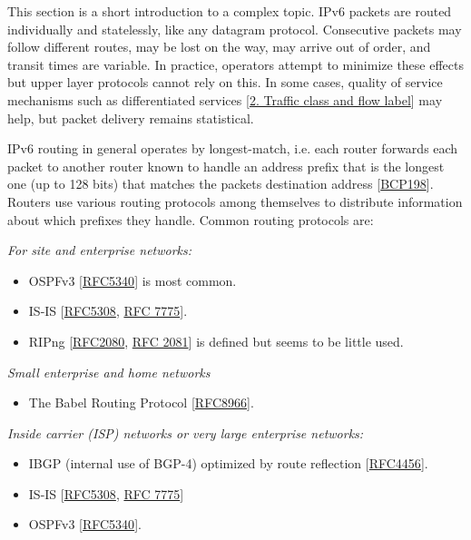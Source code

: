 \documentclass[
]{article}
\providecommand{\tightlist}{%
  \setlength{\itemsep}{0pt}\setlength{\parskip}{0pt}}
\begin{document}
This section is a short introduction to a complex topic. IPv6 packets
are routed individually and statelessly, like any datagram protocol.
Consecutive packets may follow different routes, may be lost on the way,
may arrive out of order, and transit times are variable. In practice,
operators attempt to minimize these effects but upper layer protocols
cannot rely on this. In some cases, quality of service mechanisms such
as differentiated services {[}\hyperref[traffic-class-and-flow-label]{2.
Traffic class and flow label}{]} may help, but packet delivery remains
statistical.

IPv6 routing in general operates by longest-match, i.e. each router
forwards each packet to another router known to handle an address prefix
that is the longest one (up to 128 bits) that matches the
packet\textquotesingle s destination address
{[}\href{https://www.rfc-editor.org/info/bcp198}{BCP198}{]}. Routers use
various routing protocols among themselves to distribute information
about which prefixes they handle. Common routing protocols are:

\emph{For site and enterprise networks:}

\begin{itemize}
\item
  OSPFv3 {[}\href{https://www.rfc-editor.org/info/rfc5340}{RFC5340}{]}
  is most common.
\item
  IS-IS {[}\href{https://www.rfc-editor.org/info/rfc5308}{RFC5308},
  \href{https://www.rfc-editor.org/info/rfc7775}{RFC 7775}{]}.
\item
  RIPng {[}\href{https://www.rfc-editor.org/info/rfc2080}{RFC2080},
  \href{https://www.rfc-editor.org/info/rfc2081}{RFC 2081}{]} is defined
  but seems to be little used.
\end{itemize}

\emph{Small enterprise and home networks}

\begin{itemize}
\tightlist
\item
  The Babel Routing Protocol
  {[}\href{https://www.rfc-editor.org/info/rfc8966}{RFC8966}{]}.
\end{itemize}

\emph{Inside carrier (ISP) networks or very large enterprise networks:}

\begin{itemize}
\item
  IBGP (internal use of BGP-4) optimized by route reflection
  {[}\href{https://www.rfc-editor.org/info/rfc4456}{RFC4456}{]}.
\item
  IS-IS {[}\href{https://www.rfc-editor.org/info/rfc5308}{RFC5308},
  \href{https://www.rfc-editor.org/info/rfc7775}{RFC 7775}{]}
\item
  OSPFv3 {[}\href{https://www.rfc-editor.org/info/rfc5340}{RFC5340}{]}.
\end{itemize}
\end{document}
